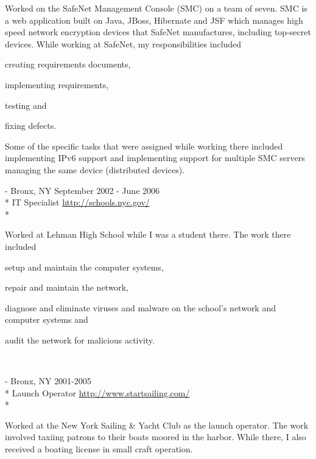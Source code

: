 \documentclass[a4paper,margin,line]{resume}
\newcommand{\rurl}[1]{\hfill {\footnotesize \url{#1}}}
\newcommand{\rdate}[1]{\hfill {\small #1}}
\renewcommand{\employer}[5]{\item[#1] - #2 \rdate{#3} \\* #4 \rurl{#5} \\*}
\begin{document}
\begin{resume}
\begin{asparadesc}
		\small
		Worked on the SafeNet Management Console (SMC) on a team of seven. SMC is
		a web application built on Java, JBoss, Hibernate and JSF which manages high
		speed network encryption devices that SafeNet manufactures, including
		top-secret devices. While working at SafeNet, my responsibilities included
		\begin{inparaenum} \item creating requirements documents, \item implementing
		requirements, \item testing and \item fixing defects. \end{inparaenum} Some
		of the specific tasks that were assigned while working there included
		implementing IPv6 support and implementing support for multiple SMC servers
		managing the same device (distributed devices).
		\normalsize
		\\
		\employer{New York City Department of Education}{Bronx, NY}{September 2002 -
		June 2006}{IT Specialist}{http://schools.nyc.gov/}

		\small
		Worked at Lehman High School while I was a student there. The work there
		included \begin{inparaenum} \item setup and maintain the computer systems,
		\item repair and maintain the network, \item diagnose and eliminate viruses
		and malware on the school's network and computer systems and \item audit the
		network for malicious activity. \end{inparaenum}
		\normalsize
		\\
		\employer{New York Sailing \& Yacht Club}{Bronx, NY}{2001-2005}{Launch
		Operator}{http://www.startsailing.com/}
		
		\small
		Worked at the New York Sailing \& Yacht Club as the launch operator. The
		work involved taxiing patrons to their boats moored in the harbor. While
		there, I also received a boating license in small craft operation.
		\normalsize
	\end{asparadesc}


\end{resume}
\end{document}
